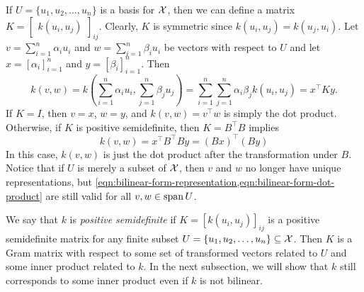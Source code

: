 If \(U = \{u_1, u_2, \dots, u_n\}\) is a basis for \(\mathcal{X}\), then we can define a matrix \(K = \begin{bmatrix}
    k(u_i, u_j)
\end{bmatrix}_{ij}\).
Clearly, \(K\) is symmetric since \(k(u_i, u_j) = k(u_j, u_i)\).
Let \(v = \sum_{i=1}^n \alpha_i u_i\) and \(w = \sum_{i=1}^n \beta_i u_i\) be vectors with respect to \(U\) and let \(x = [\alpha_i]_{i=1}^n\) and \(y = [\beta_i]_{i=1}^n\).
Then
\begin{equation}
    \label{eqn:bilinear-form-representation}
    k(v,w)
    = k\left(\sum_{i=1}^n \alpha_i u_i, \sum_{j=1}^{n} \beta_j u_j\right)
    = \sum_{i=1}^n \sum_{j=1}^{n} \alpha_i \beta_j k\left(u_i, u_j\right)
    = x^\top K y.
\end{equation}
If \(K = I\), then \(v = x\), \(w = y\), and \(k(v,w) = v^\top w\) is simply the dot product.
Otherwise, if \(K\) is positive semidefinite, then \(K = B^\top B\) implies
\begin{equation}
    \label{eqn:bilinear-form-dot-product}
    k(v,w) = x^\top B^\top B y = (Bx)^\top (By)
\end{equation}
In this case, \(k(v,w)\) is just the dot product after the transformation under \(B\).
Notice that if \(U\) is merely a subset of \(\mathcal{X}\), then \(v\) and \(w\) no longer have unique representations, but \cref{eqn:bilinear-form-representation,eqn:bilinear-form-dot-product} are still valid for all \(v, w \in \operatorname{span} U\).

We say that \(k\) is \textit{positive semidefinite} if \(K = [k(u_i, u_j)]_{ij}\) is a positive semidefinite matrix for any finite subset \(U = \{u_1, u_2,\dots, u_n\} \subseteq \mathcal{X}\).
Then \(K\) is a Gram matrix with respect to some set of transformed vectors related to \(U\) and some inner product related to \(k\).
In the next subsection, we will show that \(k\) still corresponds to some inner product even if \(k\) is not bilinear.
